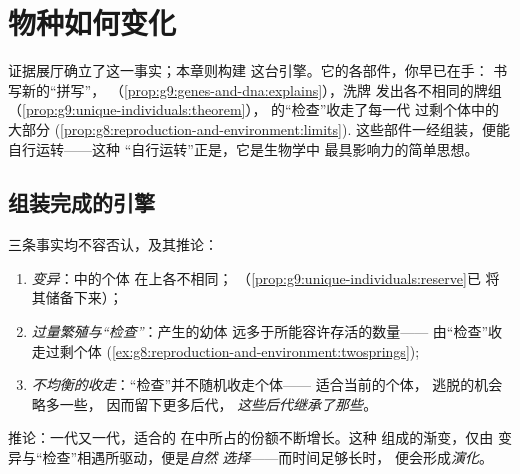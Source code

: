 \chapter{物种如何变化}\label{ch:g9:how-species-change}

证据展厅确立了这一事实；本章则构建
这台引擎。它的各部件，你早已在手：
书写新的“拼写”，
（\cref{prop:g9:genes-and-dna:explains}），洗牌
发出各不相同的牌组（\cref{prop:g9:unique-individuals:theorem}），
的“检查”收走了每一代
过剩个体中的大部分
(\cref{prop:g8:reproduction-and-environment:limits}).
这些部件一经组装，便能自行运转——这种
“自行运转”正是，它是生物学中
最具影响力的简单思想。

\section{组装完成的引擎}

\begin{proposition}[自然选择]\label{prop:g9:how-species-change:selection}
三条事实均不容否认，及其推论：
\begin{enumerate}
  \item \emph{变异}：中的个体
        在上各不相同；
        （\cref{prop:g9:unique-individuals:reserve}已
        将其储备下来）；
  \item \emph{过量繁殖与“检查”}：产生的幼体
        远多于所能容许存活的数量——
        由“检查”收走过剩个体
        (\cref{ex:g8:reproduction-and-environment:twosprings});
  \item \emph{不均衡的收走}：“检查”并不随机收走个体——
        适合当前的个体，
        逃脱的机会略多一些，
        因而留下更多后代，
        \emph{这些后代继承了那些}。
\end{enumerate}
推论：一代又一代，适合的
在中所占的份额不断增长。这种
组成的渐变，仅由
变异与“检查”相遇所驱动，便是\emph{自然
选择}——而时间足够长时，
便会形成\emph{演化}。
\end{proposition}
\admitted

